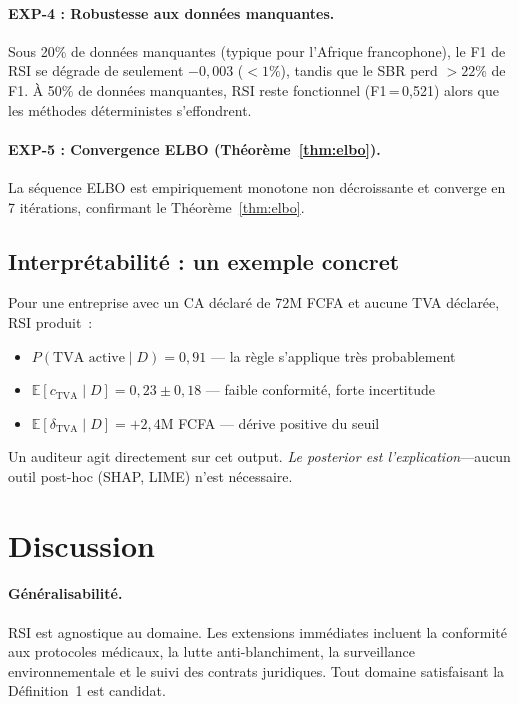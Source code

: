 \documentclass[letterpaper]{article}
\begin{document}
\paragraph{EXP-4 : Robustesse aux donn\'ees manquantes.}
Sous 20\% de donn\'ees manquantes (typique pour l'Afrique francophone),
le F1 de RSI se d\'egrade de seulement $-0,003$ ($< 1\%$), tandis que
le SBR perd $> 22\%$ de F1. \`A 50\% de donn\'ees manquantes, RSI
reste fonctionnel (F1\,=\,0,521) alors que les m\'ethodes
d\'eterministes s'effondrent.

\paragraph{EXP-5 : Convergence ELBO (Th\'eor\`eme~\ref{thm:elbo}).}
La s\'equence ELBO est empiriquement monotone non d\'ecroissante et
converge en 7 it\'erations, confirmant le Th\'eor\`eme~\ref{thm:elbo}.

\subsection{Interpr\'etabilit\'e : un exemple concret}

Pour une entreprise avec un CA d\'eclar\'e de 72M FCFA et aucune
TVA d\'eclar\'ee, RSI produit~:
\begin{itemize}[leftmargin=2em]
  \item $P(\text{TVA active} \mid D) = 0,91$ --- la r\`egle s'applique
        tr\`es probablement
  \item $\mathbb{E}[c_{\text{TVA}} \mid D] = 0,23 \pm 0,18$ --- faible
        conformit\'e, forte incertitude
  \item $\mathbb{E}[\delta_{\text{TVA}} \mid D] = +2,4$M FCFA --- d\'erive
        positive du seuil
\end{itemize}
Un auditeur agit directement sur cet output.
\emph{Le posterior est l'explication}---aucun outil post-hoc (SHAP,
LIME) n'est n\'ecessaire.

\section{Discussion}
\label{sec:discussion}

\paragraph{G\'en\'eralisabilit\'e.}
RSI est agnostique au domaine. Les extensions imm\'ediates incluent
la conformit\'e aux protocoles m\'edicaux, la lutte anti-blanchiment,
la surveillance environnementale et le suivi des contrats juridiques.
Tout domaine satisfaisant la D\'efinition~1 est candidat.
\end{document}
